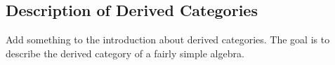 \documentclass[11pt]{article}
\theoremstyle{definition}
\theoremstyle{remark}
\begin{document}
        \subsection{Description of Derived Categories}

            Add something to the introduction about derived categories. The goal is to describe the derived category of a fairly simple algebra.

    \clearpage

    \nocite{*}
    
    

    \clearpage


\end{document}
